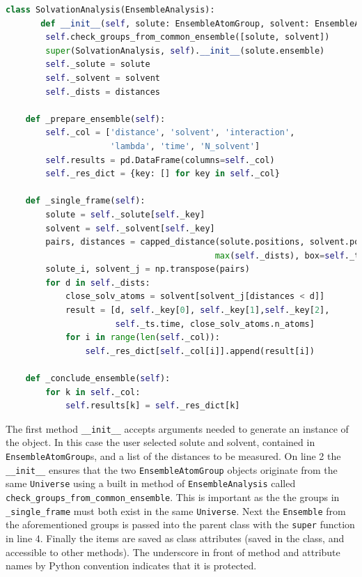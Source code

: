 \documentclass{article}[letterpaper, margins=1in, 12pt]
\begin{document}
\begin{lstlisting}[language=Python]
class SolvationAnalysis(EnsembleAnalysis):
       def __init__(self, solute: EnsembleAtomGroup, solvent: EnsembleAtomGroup, distances: List[float]):
        self.check_groups_from_common_ensemble([solute, solvent])
        super(SolvationAnalysis, self).__init__(solute.ensemble)
        self._solute = solute
        self._solvent = solvent
        self._dists = distances

    def _prepare_ensemble(self):
        self._col = ['distance', 'solvent', 'interaction',
                     'lambda', 'time', 'N_solvent']
        self.results = pd.DataFrame(columns=self._col)
        self._res_dict = {key: [] for key in self._col}

    def _single_frame(self):
        solute = self._solute[self._key]
        solvent = self._solvent[self._key]
        pairs, distances = capped_distance(solute.positions, solvent.positions,
                                          max(self._dists), box=self._ts.dimensions)
        solute_i, solvent_j = np.transpose(pairs)
        for d in self._dists:
            close_solv_atoms = solvent[solvent_j[distances < d]]
            result = [d, self._key[0], self._key[1],self._key[2],
                      self._ts.time, close_solv_atoms.n_atoms]
            for i in range(len(self._col)):
                self._res_dict[self._col[i]].append(result[i])

    def _conclude_ensemble(self):
        for k in self._col:
            self.results[k] = self._res_dict[k]
\end{lstlisting}

The first method \lstinline{__init__} accepts arguments needed to generate an instance of the object. In this case the user selected solute and solvent, contained in \texttt{EnsembleAtomGroup}s, and a list of the distances to be measured. On line 2 the \lstinline{__init__} ensures that the two \texttt{EnsembleAtomGroup} objects originate from the same \texttt{Universe} using a built in method of \texttt{EnsembleAnalysis} called \lstinline{check_groups_from_common_ensemble}. This is important as the the groups in \lstinline{_single_frame} must both exist in the same \texttt{Universe}. Next the \texttt{Ensemble} from the aforementioned groups is passed into the parent class with the \lstinline{super} function in line 4. Finally the items are saved as class attributes (saved in the class, and accessible to other methods). The underscore in front of method and attribute names by Python convention indicates that it is protected.
\end{document}
